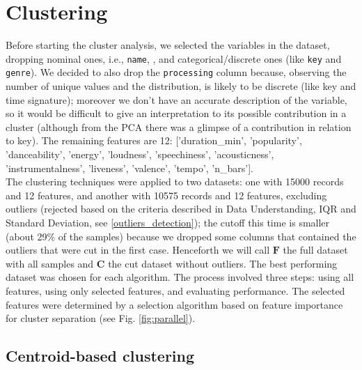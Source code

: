 \chapter*{Clustering} %
\vspace{-10mm}
Before starting the cluster analysis, we selected the variables in the dataset, dropping nominal ones, i.e., \texttt{name}, ,  and categorical/discrete ones (like \texttt{key} and \texttt{genre}). We decided to also drop the \texttt{processing} column because, observing the number of unique values and the distribution, is likely to be discrete (like key and time signature); moreover we don't have an accurate description of the variable, so it would be difficult to give an interpretation to its possible contribution in a cluster (although from the PCA there was a glimpse of a contribution in relation to key). The remaining features are 12: ['duration\_min', 'popularity', 'danceability', 'energy', 'loudness', 'speechiness', 'acousticness', 'instrumentalness', 'liveness', 'valence', 'tempo', 'n\_bars'].\\
The clustering techniques were applied to two datasets: one with 15000 records and 12 features, and another with 10575 records and 12 features, excluding outliers (rejected based on the criteria described in Data Understanding, IQR and Standard Deviation, see \ref{outliers_detection}); the cutoff this time is smaller (about 29\% of the samples) because we dropped some columns that contained the outliers that were cut in the first case. Henceforth we will call $\mathbf{F}$ the full dataset with all samples and $\mathbf{C}$ the cut dataset without outliers. The best performing dataset was chosen for each algorithm. The process involved three steps: using all features, using only selected features, and evaluating performance. The selected features were determined by a selection algorithm based on feature importance for cluster separation (see Fig. \ref{fig:parallel}).
\section{Centroid-based clustering}
